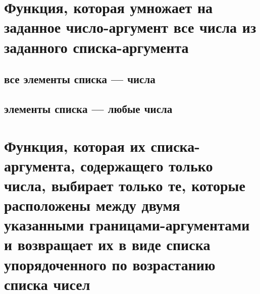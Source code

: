 \section{Функция, которая умножает на заданное число-аргумент все числа из заданного списка-аргумента}


\subsection{все элементы списка --- числа}


\subsection{элементы списка --- любые числа}



\section{Функция, которая их списка-аргумента, содержащего только числа, выбирает только те, которые расположены между двумя указанными гра\-ни\-ца\-ми-аргументами и возвращает их в виде списка упорядоченного по возрастанию списка чисел}